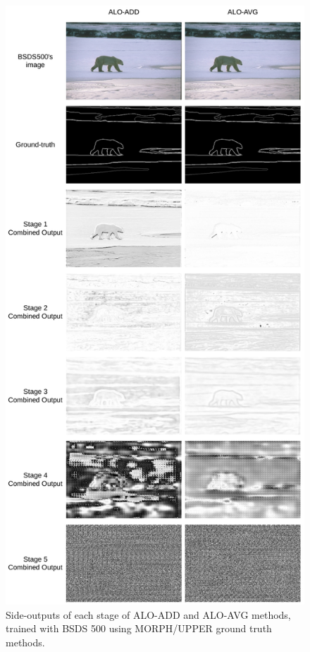 \begin{figure}%
  \centering
  \includegraphics[width=1\columnwidth]{../imagens/ilustracoes/cap6_bsds_stage_outputs.png} %
  \caption{Side-outputs of each stage of ALO-ADD and ALO-AVG methods, trained with BSDS 500 using MORPH/UPPER ground truth methods.}
  \label{fig:bsds_stage_outputs}
\end{figure}

